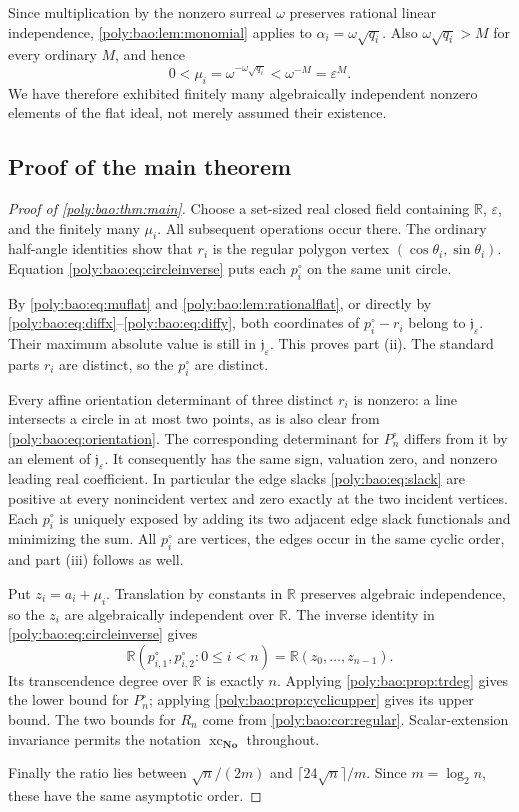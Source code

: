 \documentclass[11pt,a4paper]{article}
\numberwithin{equation}{section}
\theoremstyle{plain}
\newcommand{\No}{\mathbf{No}}
\newcommand{\R}{\mathbb R}
\newcommand{\eps}{\varepsilon}
\newcommand{\xc}{\operatorname{xc}}
\newcommand{\JJ}{\mathfrak j}
\begin{document}
Since multiplication by the nonzero surreal $\omega$ preserves rational
linear independence, \cref{poly:bao:lem:monomial} applies to
$\alpha_i=\omega\sqrt{q_i}$. Also $\omega\sqrt{q_i}>M$ for every ordinary
$M$, and hence
\begin{equation}\label{poly:bao:eq:muflat}
 0<\mu_i=\omega^{-\omega\sqrt{q_i}}<\omega^{-M}=\eps^M.
\end{equation}
We have therefore exhibited finitely many algebraically independent
nonzero elements of the flat ideal, not merely assumed their existence.

\subsection{Proof of the main theorem}\label{poly:bao:sec:proofmain}
\begin{proof}[Proof of \cref{poly:bao:thm:main}]
Choose a set-sized real closed field containing $\R$, $\eps$, and the
finitely many $\mu_i$. All subsequent operations occur there.
The ordinary half-angle identities show that $r_i$ is the regular
polygon vertex $(\cos\theta_i,\sin\theta_i)$. Equation
\eqref{poly:bao:eq:circleinverse} puts each $p^\circ_i$ on the same unit circle.

By \eqref{poly:bao:eq:muflat} and \cref{poly:bao:lem:rationalflat}, or directly by
\eqref{poly:bao:eq:diffx}--\eqref{poly:bao:eq:diffy}, both coordinates of $p^\circ_i-r_i$ belong to $\JJ_\eps$.
Their maximum absolute value is still in $\JJ_\eps$. This proves part (ii).
The standard parts $r_i$ are distinct, so the $p^\circ_i$ are distinct.

Every affine orientation determinant of three distinct $r_i$ is nonzero:
a line intersects a circle in at most two points, as is also clear from
\eqref{poly:bao:eq:orientation}. The corresponding determinant for $P^\circ_n$ differs
from it by an element of $\JJ_\eps$. It consequently has the same sign,
valuation zero, and nonzero leading real coefficient. In particular the
edge slacks \eqref{poly:bao:eq:slack} are positive at every nonincident vertex and
zero exactly at the two incident vertices. Each $p^\circ_i$ is uniquely exposed
by adding its two adjacent edge slack functionals and minimizing the sum.
All $p^\circ_i$ are vertices, the edges occur in the same cyclic order, and
part (iii) follows as well.

Put $z_i=a_i+\mu_i$. Translation by constants in $\R$ preserves algebraic
independence, so the $z_i$ are algebraically independent over $\R$.
The inverse identity in \eqref{poly:bao:eq:circleinverse} gives
\[
 \R(p^\circ_{i,1},p^\circ_{i,2}:0\leq i<n)=\R(z_0,\ldots,z_{n-1}).
\]
Its transcendence degree over $\R$ is exactly $n$. Applying
\cref{poly:bao:prop:trdeg} gives the lower bound for $P^\circ_n$; applying
\cref{poly:bao:prop:cyclicupper} gives its upper bound. The two bounds for $R_n$
come from \cref{poly:bao:cor:regular}. Scalar-extension invariance permits the
notation $\xc_{\No}$ throughout.

Finally the ratio lies between $\sqrt n/(2m)$ and
$\lceil24\sqrt n\rceil/m$. Since $m=\log_2 n$, these have the same
asymptotic order.
\end{proof}
\end{document}
